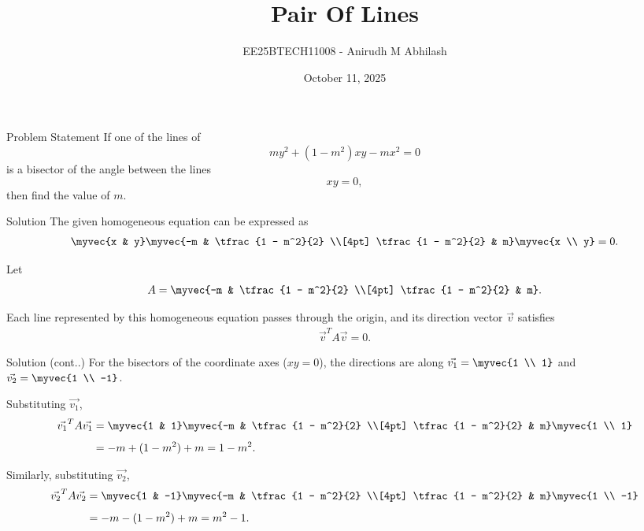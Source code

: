 \documentclass{beamer}
\title{Pair Of Lines}
\author{EE25BTECH11008 - Anirudh M Abhilash}
\date{October 11, 2025}
\begin{document}
\begin{frame}
\titlepage
\end{frame}

\begin{frame}{Problem Statement}
If one of the lines of 
\[
m y^2 + (1 - m^2)xy - m x^2 = 0
\]
is a bisector of the angle between the lines 
\[
xy = 0,
\]
then find the value of $m$.
\end{frame}

\begin{frame}{Solution}
The given homogeneous equation can be expressed as
\begin{align}
\myvec{x & y}
\myvec{-m & \tfrac{1 - m^2}{2} \\[4pt] \tfrac{1 - m^2}{2} & m}
\myvec{x \\ y} = 0.
\end{align}

Let 
\[
A = \myvec{-m & \tfrac{1 - m^2}{2} \\[4pt] \tfrac{1 - m^2}{2} & m}.
\]

Each line represented by this homogeneous equation passes through the origin, and its direction vector $\vec{v}$ satisfies
\begin{align}
\vec{v}^T A \vec{v} = 0.
\end{align}
\end{frame}

\begin{frame}{Solution (cont..)}
For the bisectors of the coordinate axes ($xy=0$), the directions are along $\vec{v_1} = \myvec{1 \\ 1}$ and $\vec{v_2} = \myvec{1 \\ -1}$.

Substituting $\vec{v_1}$,
\begin{align}
\vec{v_1}^T A \vec{v_1} &= \myvec{1 & 1}
\myvec{-m & \tfrac{1 - m^2}{2} \\[4pt] \tfrac{1 - m^2}{2} & m}
\myvec{1 \\ 1} \\[4pt]
&= -m + (1 - m^2) + m = 1 - m^2.
\end{align}

Similarly, substituting $\vec{v_2}$,
\begin{align}
\vec{v_2}^T A \vec{v_2} &= \myvec{1 & -1}
\myvec{-m & \tfrac{1 - m^2}{2} \\[4pt] \tfrac{1 - m^2}{2} & m}
\myvec{1 \\ -1} \\[4pt]
&= -m - (1 - m^2) + m = m^2 - 1.
\end{align}
\end{frame}
\end{document}
